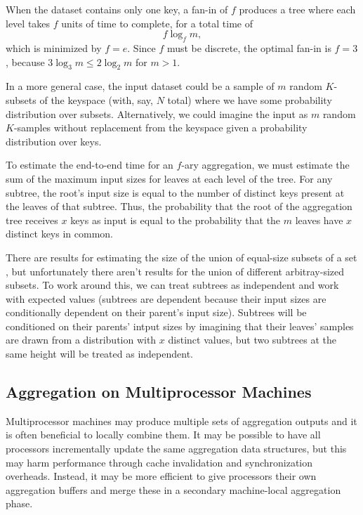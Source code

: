\documentclass[12pt]{article}
\begin{document}
When the dataset contains only one key, a fan-in of $f$ produces a tree
where each level takes $f$ units of time to complete, for a total time of
\[
    f \log_f m,
\]
which is minimized by $f = e$.  Since $f$ must be discrete, the optimal fan-in
is $f = 3$, because $3 \log_3 m \leq 2 \log_2 m$ for $m > 1$.

In a more general case, the input dataset could be a sample of $m$ random
$K$-subsets of the keyspace (with, say, $N$ total) where we have some
probability distribution over subsets.  Alternatively, we could imagine the
input as $m$ random $K$-samples without replacement from the keyspace given
a probability distribution over keys.

To estimate the end-to-end time for an $f$-ary aggregation, we must
estimate the sum of the maximum input sizes for leaves at each level of the
tree.  For any subtree, the root's input size is equal to the number of
distinct keys present at the leaves of that subtree.  Thus, the probability
that the root of the aggregation tree receives $x$ keys as input is equal to
the probability that the $m$ leaves have $x$ distinct keys in common.

There are results for estimating the size of the union of equal-size subsets
of a set \cite{union-of-subsets}, but unfortunately there aren't results for
the union of different arbitray-sized subsets.
To work around this, we can treat subtrees as independent and work with
expected values (subtrees are dependent because their input sizes are
conditionally dependent on their parent's input size).  Subtrees will be
conditioned on their parents' intput sizes by imagining that their leaves'
samples are drawn from a distribution with $x$ distinct values, but two
subtrees at the same height will be treated as independent.


\pagebreak
\pagebreak

\subsection{Aggregation on Multiprocessor Machines}

Multiprocessor machines may produce multiple sets of aggregation outputs and
it is often beneficial to locally combine them.  It may be possible to have
all processors incrementally update the same aggregation data structures, but
this may harm performance through cache invalidation and synchronization
overheads.  Instead, it may be more efficient to give processors their own
aggregation buffers and merge these in a secondary machine-local aggregation
phase.
\end{document}
